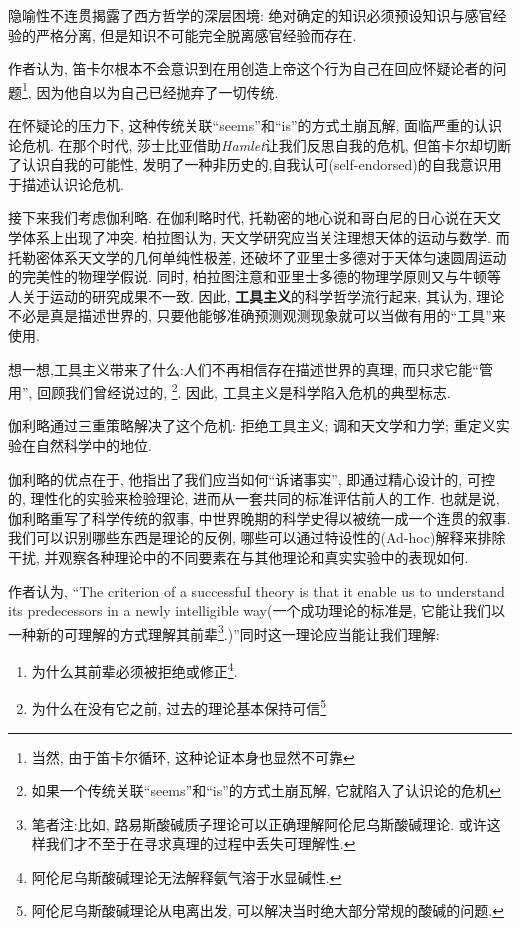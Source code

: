 \documentclass[12pt, a4paper, oneside]{ctexart}
\renewcommand{\b}{\textbf}
\newcommand{\f}{\footnote}
\begin{document}
隐喻性不连贯揭露了西方哲学的深层困境: 绝对确定的知识必须预设知识与感官经验的严格分离, 但是知识不可能完全脱离感官经验而存在.

作者认为, 笛卡尔根本不会意识到在用创造上帝这个行为自己在回应怀疑论者的问题\f{当然, 由于笛卡尔循环, 这种论证本身也显然不可靠}, 因为他自以为自己已经抛弃了一切传统.

在怀疑论的压力下, 这种传统关联``seems''和``is''的方式土崩瓦解, 面临严重的认识论危机. 在那个时代, 莎士比亚借助\textit{Hamlet}让我们反思自我的危机, 但笛卡尔却切断了认识自我的可能性, 发明了一种非历史的,自我认可(self-endorsed)的自我意识用于描述认识论危机.

接下来我们考虑伽利略. 在伽利略时代, 托勒密的地心说和哥白尼的日心说在天文学体系上出现了冲突. 柏拉图认为, 天文学研究应当关注理想天体的运动与数学. 而托勒密体系天文学的几何单纯性极差, 还破坏了亚里士多德对于天体匀速圆周运动的完美性的物理学假说. 同时, 柏拉图注意和亚里士多德的物理学原则又与牛顿等人关于运动的研究成果不一致. 因此, \b{工具主义}的科学哲学流行起来, 其认为, 理论不必是真是描述世界的, 只要他能够准确预测观测现象就可以当做有用的``工具''来使用. 

想一想,工具主义带来了什么:人们不再相信存在描述世界的真理, 而只求它能``管用'', 回顾我们曾经说过的, \f{如果一个传统关联``seems''和``is''的方式土崩瓦解, 它就陷入了认识论的危机}. 因此, 工具主义是科学陷入危机的典型标志.

伽利略通过三重策略解决了这个危机: 拒绝工具主义; 调和天文学和力学; 重定义实验在自然科学中的地位. 

伽利略的优点在于, 他指出了我们应当如何``诉诸事实'', 即通过精心设计的, 可控的, 理性化的实验来检验理论, 进而从一套共同的标准评估前人的工作. 也就是说, 伽利略重写了科学传统的叙事, 中世界晚期的科学史得以被统一成一个连贯的叙事. 我们可以识别哪些东西是理论的反例, 哪些可以通过特设性的(Ad-hoc)解释来排除干扰, 并观察各种理论中的不同要素在与其他理论和真实实验中的表现如何.

作者认为, ``The criterion of a successful theory is that it enable us to understand its predecessors in a newly intelligible way(一个成功理论的标准是, 它能让我们以一种新的可理解的方式理解其前辈\f{笔者注:比如, 路易斯酸碱质子理论可以正确理解阿伦尼乌斯酸碱理论. 或许这样我们才不至于在寻求真理的过程中丢失可理解性. }.)''同时这一理论应当能让我们理解:

\begin{enumerate}
    \item 为什么其前辈必须被拒绝或修正\f{阿伦尼乌斯酸碱理论无法解释氨气溶于水显碱性. }.
    \item 为什么在没有它之前, 过去的理论基本保持可信\f{阿伦尼乌斯酸碱理论从电离出发, 可以解决当时绝大部分常规的酸碱的问题. }
\end{enumerate}
\end{document}
